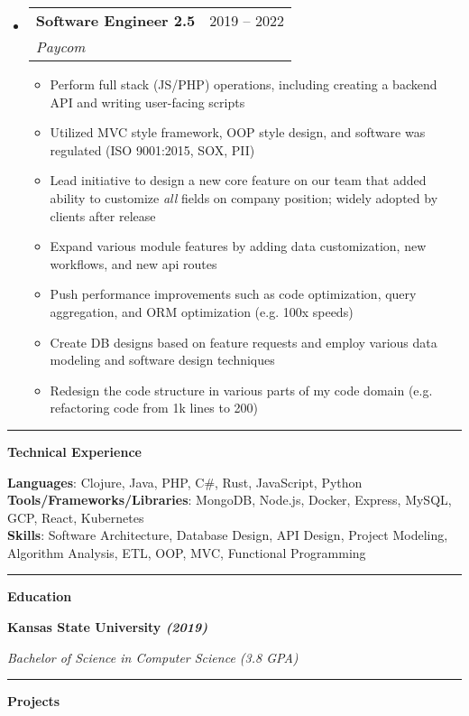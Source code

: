 \documentclass[letterpaper,11pt]{article}
\makeatletter
\newcommand{\resumeItem}[1]{
  \item\small{
    {#1 \vspace{-2pt}}
  }
}
\newcommand{\resumeSubheading}[4]{
  \vspace{-2pt}\item
    \begin{tabular*}{0.97\textwidth}[t]{l@{\extracolsep{\fill}}r}
      \textbf{#1} & #2 \\
      \textit{\small#3} & \textit{\small #4} \\
    \end{tabular*}\vspace{0pt}
}
\newcommand{\resumeSubHeadingListStart}{\begin{itemize}[leftmargin=0.15cm, label={}]}
\newcommand{\resumeSubHeadingListEnd}{\end{itemize}}
\newcommand{\resumeItemListStart}{\begin{itemize}}
\newcommand{\resumeItemListEnd}{\end{itemize}\vspace{-5pt}}
\makeatother
\begin{document}
\resumeSubHeadingListStart
\resumeSubheading
{Software Engineer 2.5}{2019 – 2022}
{Paycom}{}
\resumeItemListStart
\resumeItem{Perform full stack (JS/PHP) operations, including creating a backend API and writing user-facing scripts}
\resumeItem{Utilized MVC style framework, OOP style design, and software was regulated (ISO 9001:2015, SOX, PII)}
\resumeItem{Lead initiative to design a new core feature on our team that added ability to customize \textit{all} fields on company position; widely adopted by clients after release }
\resumeItem{Expand various module features by adding data customization, new workflows, and new api routes}
\resumeItem{Push performance improvements such as code optimization, query aggregation, and ORM optimization (e.g. 100x speeds)}
\resumeItem{Create DB designs based on feature requests and employ various data modeling and software design techniques}
\resumeItem{Redesign the code structure in various parts of my code domain (e.g. refactoring code from 1k lines to 200)}
\resumeItemListEnd
\resumeSubHeadingListEnd
\noindent\rule{19.5cm}{0.4pt}

%
\textbf{\large \textcolor{magic_blue}{Technical Experience} }

\textbf{ Languages}{: Clojure, Java, PHP, C\#, Rust, JavaScript, Python } \\

\textbf{ Tools/Frameworks/Libraries}{: MongoDB, Node.js, Docker, Express, MySQL, GCP, React, Kubernetes } \\

\textbf{ Skills}{: }
Software Architecture, Database Design, API Design, Project Modeling, Algorithm Analysis, ETL, OOP, MVC, Functional Programming

\noindent\rule{19.5cm}{0.4pt}

\textbf{\large \textcolor{magic_blue}{Education}}

\begin{minipage}[t]{0.45\textwidth}
    \raggedright
    \textbf{ Kansas State University \textit{(2019)}} \\
\end{minipage}
\hfill
\begin{minipage}[t]{0.45\textwidth}
    \raggedleft
    \textit{Bachelor of Science in Computer Science (3.8 GPA)} \\
\end{minipage}
\noindent\rule{19.5cm}{0.4pt}

\textbf{\large \textcolor{magic_blue}{Projects}}
\end{document}

